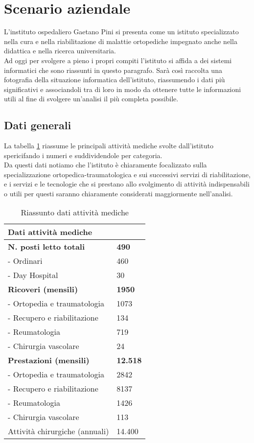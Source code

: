 \newpage

\section{Scenario aziendale} \label{ref:scenario}
	L'instituto ospedaliero Gaetano Pini si presenta come un istituto specializzato nella cura e nella riabilitazione di malattie ortopediche impegnato anche nella didattica e nella ricerca universitaria. \\Ad oggi per svolgere a pieno i propri compiti l'istituto si affida a dei sistemi informatici che sono riassunti in questo paragrafo.
	Sarà così raccolta una fotografia della situazione informatica dell'istituto, riassumendo i dati più significativi e associandoli tra di loro in modo da ottenere tutte le informazioni utili al fine di svolgere un'analisi il più completa possibile.
	
	\subsection{Dati generali}
	La tabella \ref{tab:attivitaMediche} riassume le principali attività mediche svolte dall'istituto spericifando i numeri e suddividendole per categoria. \\
	Da questi dati notiamo che l’istituto è chiaramente focalizzato sulla specializzazione ortopedica-traumatologica e sui successivi servizi di riabilitazione, e i servizi e le tecnologie che si prestano allo svolgimento di attività indispensabili o utili per questi saranno chiaramente considerati maggiormente nell'analisi. \\
	\begin{table}[h] 
		\centering
		\begin{tabular}{|l|l|}
			\hline
			\rowcolor[HTML]{EFEFEF} 
			\textbf{Dati attività mediche} & \\ \hline
			\textbf{N. posti letto totali}					& \textbf{490} \\
			- Ordinari 							& 460 \\
			- Day Hospital 					& 30 	\\ \hline
			\textbf{Ricoveri (mensili)}  				& \textbf{1950}			\\
			- Ortopedia e traumatologia   & 1073 \\
			- Recupero e riabilitazione 	& 134 \\
			- Reumatologia 						& 719 \\
			- Chirurgia vascolare  				& 24 \\ \hline
			\textbf{Prestazioni (mensili)}	  			& \textbf{12.518}		\\
			- Ortopedia e traumatologia   & 2842 \\
			- Recupero e riabilitazione 	& 8137 \\
			- Reumatologia 						& 1426 \\
			- Chirurgia vascolare  				& 113 \\ \hline
			Attività chirurgiche (annuali)  & 14.400		\\ \hline
		\end{tabular}
	\caption{Riassunto dati attività mediche}\label{tab:attivitaMediche}
	\end{table}
	\\ \\
